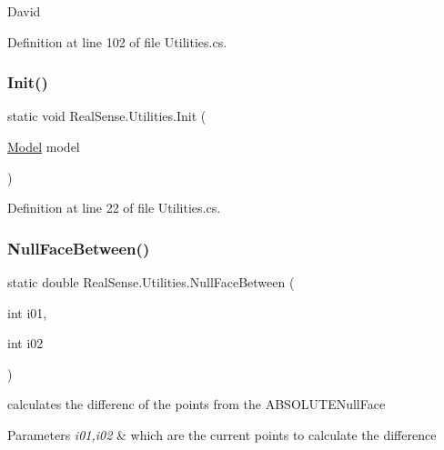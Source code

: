 David 

Definition at line 102 of file Utilities.\+cs.

\mbox{\label{class_real_sense_1_1_utilities_a9c938b11059e630719239cac212fae36}} 
\subsubsection{\texorpdfstring{Init()}{Init()}}
{\footnotesize\ttfamily static void Real\+Sense.\+Utilities.\+Init (\begin{DoxyParamCaption}\item[{\hyperlink{class_real_sense_1_1_model}{Model}}]{model }\end{DoxyParamCaption})\hspace{0.3cm}{\ttfamily [static]}}



Definition at line 22 of file Utilities.\+cs.

\mbox{\label{class_real_sense_1_1_utilities_a7a94b87d3f23a88d4bddeb6307073b0e}} 
\subsubsection{\texorpdfstring{Null\+Face\+Between()}{NullFaceBetween()}}
{\footnotesize\ttfamily static double Real\+Sense.\+Utilities.\+Null\+Face\+Between (\begin{DoxyParamCaption}\item[{int}]{i01,  }\item[{int}]{i02 }\end{DoxyParamCaption})\hspace{0.3cm}{\ttfamily [static]}}

calculates the differenc of the points from the A\+B\+S\+O\+L\+U\+T\+E\+Null\+Face 
\begin{DoxyParams}{Parameters}
{\em i01,i02} & which are the current points to calculate the difference \\
\hline
\end{DoxyParams}


